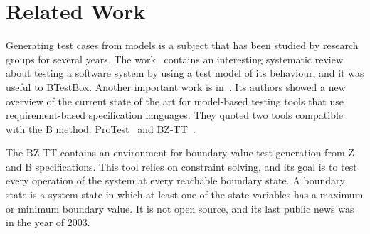 \documentclass[runningheads]{llncs}
\begin{document}



\section{Related Work} \label{sec:RelatedWork}
Generating test cases from models is a subject that has been studied by research groups for several years. The work~\cite{shafique2010systematic} contains an interesting systematic review about testing a software system by using a test model of its behaviour, and it was useful to BTestBox. Another important work is in~\cite{marinescu:2015}. Its authors showed a new overview of the current state of the art for model-based testing tools that use requirement-based specification languages. They quoted two tools compatible with the B method: ProTest~\cite{leuschel:2005} and BZ-TT~\cite{bouquet:2002}.

The BZ-TT contains an environment for boundary-value test generation from Z and B specifications. This tool relies on constraint solving, and its goal is to test every operation of the system at every reachable boundary state. A boundary state is a system state in which at least one of the state variables has a maximum or minimum boundary value. It is not open source, and its last public news was in the year of 2003.
\end{document}

